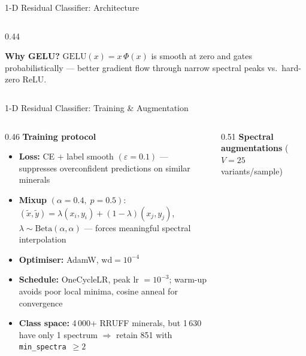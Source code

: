 \documentclass[aspectratio=169,10pt]{beamer}
\begin{document}
\begin{frame}{1-D Residual Classifier: Architecture}
\begin{columns}[T]
\begin{column}{0.44\textwidth}
      \vspace{0.08cm}
      \begin{tcolorbox}[notebox, top=2pt, bottom=2pt]
        \scriptsize\textbf{Why GELU?}\enspace
        $\mathrm{GELU}(x)=x\,\Phi(x)$ is smooth at zero
        and gates probabilistically --- better gradient flow
        through narrow spectral peaks vs.\ hard-zero ReLU.
      \end{tcolorbox}
    \end{column}
  \end{columns}
\end{frame}

\begin{frame}{1-D Residual Classifier: Training \& Augmentation}
  \begin{columns}[T]
    \begin{column}{0.46\textwidth}
      \small\textbf{\color{headerbg}Training protocol}
      \begin{itemize}\setlength\itemsep{0.06cm}\footnotesize
        \item \textbf{Loss:} CE $+$ label smooth $(\varepsilon{=}0.1)$
              --- suppresses overconfident predictions on similar minerals
        \item \textbf{Mixup} $(\alpha{=}0.4,\;p{=}0.5)$:
              $(\tilde{x},\tilde{y})=\lambda(x_i,y_i)+(1{-}\lambda)(x_j,y_j)$,\;
              $\lambda\sim\mathrm{Beta}(\alpha,\alpha)$
              --- forces meaningful spectral interpolation
        \item \textbf{Optimiser:} AdamW, $\mathrm{wd}{=}10^{-4}$
        \item \textbf{Schedule:} OneCycleLR, peak lr $= 10^{-3}$;
              warm-up avoids poor local minima, cosine anneal for convergence
        \item \textbf{Class space:} 4\,000+ RRUFF minerals, but
              1\,630 have only 1 spectrum
              $\Rightarrow$ retain 851 with \texttt{min\_spectra}~$\ge2$
      \end{itemize}
    \end{column}
    \begin{column}{0.51\textwidth}
      \small\textbf{\color{headerbg}Spectral augmentations}
      ($V=25$ variants/sample)


\end{column}
\end{columns}
\end{frame}
\end{document}
